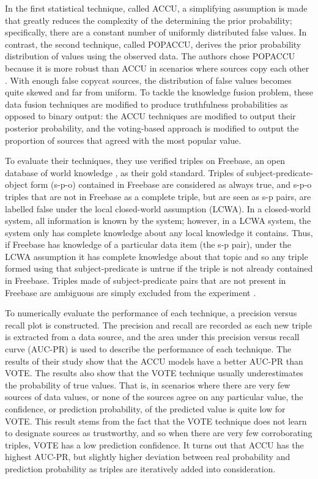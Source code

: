 In the first statistical technique, called ACCU, a simplifying assumption is made that greatly reduces the complexity of the determining the prior probability; specifically, there are a constant number of uniformly distributed false values.  In contrast, the second technique, called POPACCU, derives the prior probability distribution of values using the observed data.  The authors chose POPACCU because it is more robust than ACCU in scenarios where sources copy each other \cite{popaccu}.  With enough false copycat sources, the distribution of false values becomes quite skewed and far from uniform.  To tackle the knowledge fusion problem, these data fusion techniques are modified to produce truthfulness probabilities as opposed to binary output: the ACCU techniques are modified to output their posterior probability, and the voting-based approach is modified to output the proportion of sources that agreed with the most popular value.

To evaluate their techniques, they use verified triples on Freebase, an open database of world knowledge \cite{freebase}, as their gold standard.  Triples of subject-predicate-object form (s-p-o) contained in Freebase are considered as always true, and s-p-o triples that are not in Freebase as a complete triple, but are seen as s-p pairs, are labelled false under the local closed-world assumption (LCWA).  In a closed-world system, all information is known by the system; however, in a LCWA system, the system only has complete knowledge about any local knowledge it contains.  Thus, if Freebase has knowledge of a particular data item (the s-p pair), under the LCWA assumption it has complete knowledge about that topic and so any triple formed using that subject-predicate is untrue if the triple is not already contained in Freebase.  Triples made of subject-predicate pairs that are not present in Freebase are ambiguous are simply excluded from the experiment \cite{knowledgeFusion}.

To numerically evaluate the performance of each technique, a precision versus recall plot is constructed.  The precision and recall are recorded as each new triple is extracted from a data source, and the area under this precision versus recall curve (AUC-PR) is used to describe the performance of each technique.  The results of their study show that the ACCU models have a better AUC-PR than VOTE.  The results also show that the VOTE technique usually underestimates the probability of true values.  That is, in scenarios where there are very few sources of data values, or none of the sources agree on any particular value, the confidence, or prediction probability, of the predicted value is quite low for VOTE.  This result stems from the fact that the VOTE technique does not learn to designate sources as trustworthy, and so when there are very few corroborating triples, VOTE has a low prediction confidence.  It turns out that ACCU has the highest AUC-PR, but slightly higher deviation between real probability and prediction probability as triples are iteratively added into consideration.

